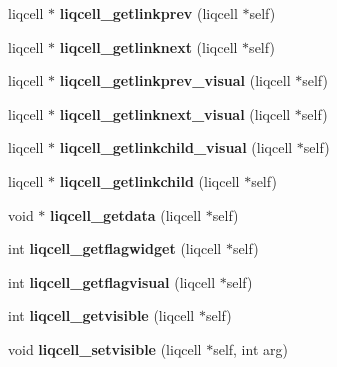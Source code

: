 \begin{CompactItemize}
liqcell $\ast$ {\bf liqcell\_\-getlinkprev} (liqcell $\ast$self)
\item 
liqcell $\ast$ {\bf liqcell\_\-getlinknext} (liqcell $\ast$self)
\item 
liqcell $\ast$ {\bf liqcell\_\-getlinkprev\_\-visual} (liqcell $\ast$self)
\item 
liqcell $\ast$ {\bf liqcell\_\-getlinknext\_\-visual} (liqcell $\ast$self)
\item 
liqcell $\ast$ {\bf liqcell\_\-getlinkchild\_\-visual} (liqcell $\ast$self)
\item 
liqcell $\ast$ {\bf liqcell\_\-getlinkchild} (liqcell $\ast$self)
\item 
void $\ast$ {\bf liqcell\_\-getdata} (liqcell $\ast$self)
\item 
int \textbf{liqcell\_\-getflagwidget} (liqcell $\ast$self)\label{d5/da2/liqcell_8c_adf07b86b328a8a0a4b05bdf805de72f}

\item 
int \textbf{liqcell\_\-getflagvisual} (liqcell $\ast$self)\label{d5/da2/liqcell_8c_32abc2c65477d6dce7f1ffca204530ef}

\item 
int \textbf{liqcell\_\-getvisible} (liqcell $\ast$self)\label{d5/da2/liqcell_8c_cd3be161e6f860b28b1b9490749c3a1a}

\item 
void \textbf{liqcell\_\-setvisible} (liqcell $\ast$self, int arg)\label{d5/da2/liqcell_8c_4e8ed6cdaff5070ce934b06a26caa569}


\end{CompactItemize}

